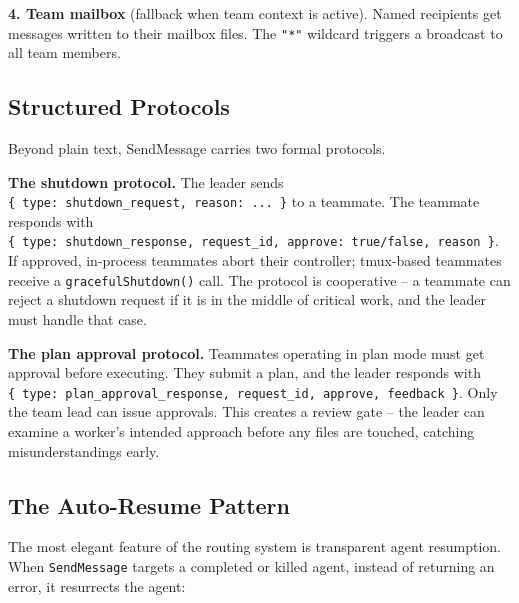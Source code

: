 \documentclass[
  english,
  11pt,
  letterpaper,
]{book}
\begin{document}
\textbf{4. Team mailbox} (fallback when team context is active). Named
recipients get messages written to their mailbox files. The \texttt{"*"}
wildcard triggers a broadcast to all team members.

\subsection{Structured Protocols}\label{structured-protocols}

Beyond plain text, SendMessage carries two formal protocols.

\textbf{The shutdown protocol.} The leader sends
\texttt{\{\ type:\ \textquotesingle{}shutdown\_request\textquotesingle{},\ reason:\ \textquotesingle{}...\textquotesingle{}\ \}}
to a teammate. The teammate responds with
\texttt{\{\ type:\ \textquotesingle{}shutdown\_response\textquotesingle{},\ request\_id,\ approve:\ true/false,\ reason\ \}}.
If approved, in-process teammates abort their controller; tmux-based
teammates receive a \texttt{gracefulShutdown()} call. The protocol is
cooperative -- a teammate can reject a shutdown request if it is in the
middle of critical work, and the leader must handle that case.

\textbf{The plan approval protocol.} Teammates operating in plan mode
must get approval before executing. They submit a plan, and the leader
responds with
\texttt{\{\ type:\ \textquotesingle{}plan\_approval\_response\textquotesingle{},\ request\_id,\ approve,\ feedback\ \}}.
Only the team lead can issue approvals. This creates a review gate --
the leader can examine a worker's intended approach before any files are
touched, catching misunderstandings early.

\subsection{The Auto-Resume Pattern}\label{the-auto-resume-pattern}

The most elegant feature of the routing system is transparent agent
resumption. When \texttt{SendMessage} targets a completed or killed
agent, instead of returning an error, it resurrects the agent:
\end{document}
